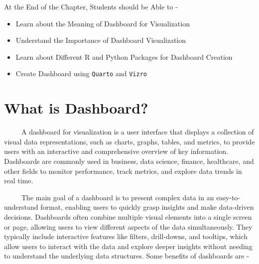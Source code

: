 \documentclass[
  letterpaper,
  DIV=11,
  numbers=noendperiod]{scrreprt}
\begin{document}
\begin{tcolorbox}[enhanced jigsaw, arc=.35mm, bottomrule=.15mm, bottomtitle=1mm, breakable, colback=white, colbacktitle=quarto-callout-note-color!10!white, colframe=quarto-callout-note-color-frame, coltitle=black, left=2mm, leftrule=.75mm, opacityback=0, opacitybacktitle=0.6, rightrule=.15mm, title=\textcolor{quarto-callout-note-color}{\faInfo}\hspace{0.5em}{Learning Objectives}, titlerule=0mm, toprule=.15mm, toptitle=1mm]

At the End of the Chapter, Students should be Able to -

\begin{itemize}
\item
  Learn about the Meaning of Dashboard for Visualization
\item
  Understand the Importance of Dashboard Visualization
\item
  Learn about Different R and Python Packages for Dashboard Creation
\item
  Create Dashboard using \texttt{Quarto} and \texttt{Vizro}
\end{itemize}

\end{tcolorbox}

\section{What is Dashboard?}\label{what-is-dashboard}

~~~~~A dashboard for visualization is a user interface that displays a
collection of visual data representations, such as charts, graphs,
tables, and metrics, to provide users with an interactive and
comprehensive overview of key information. Dashboards are commonly used
in business, data science, finance, healthcare, and other fields to
monitor performance, track metrics, and explore data trends in real
time.

~~~~~The main goal of a dashboard is to present complex data in an
easy-to-understand format, enabling users to quickly grasp insights and
make data-driven decisions. Dashboards often combine multiple visual
elements into a single screen or page, allowing users to view different
aspects of the data simultaneously. They typically include interactive
features like filters, drill-downs, and tooltips, which allow users to
interact with the data and explore deeper insights without needing to
understand the underlying data structures. Some benefits of dashboards
are -
\end{document}
